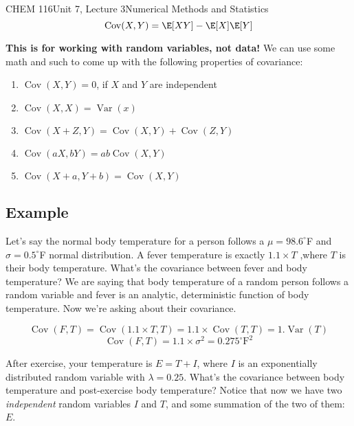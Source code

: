 \documentclass{article}
\DeclareMathOperator{\Var}{Var}
\DeclareMathOperator{\Cov}{Cov}
\begin{document}
\begin{tdoc}{CHEM 116}{Unit 7, Lecture 3}{Numerical Methods and Statistics}
\begin{equation}
  \Cov(X,Y) = \E[XY] - \E[X]\E[Y]
\end{equation}

{\bf This is for working with random variables, not data!} We can use
some math and such to come up with the following properties of covariance:

\begin{enumerate}

\item $\Cov(X,Y) = 0$, if $X$ and $Y$ are independent\\

\item $\Cov(X,X) = \Var(x)$\\

\item $\Cov(X + Z, Y) = \Cov(X,Y) + \Cov(Z, Y)$\\

\item $\Cov(aX, bY) = ab\Cov(X,Y)$\\

\item $\Cov(X + a, Y + b) = \Cov(X,Y)$\\

\end{enumerate}

\subsection{Example}

Let's say the normal body temperature for a person follows a $\mu = 98.6 ^{\circ}$F and $\sigma=0.5 ^{\circ}$F normal distribution. A fever temperature is exactly $1.1\times T$ ,where $T$ is their body temperature. What's the covariance between fever and body temperature? We are saying that body temperature of a random person follows a random variable and fever is an analytic, deterministic function of body temperature. Now we're asking about their covariance.

\[
\Cov(F, T) = \Cov(1.1\times T, T) = 1.1\times \Cov(T, T) = 1. \Var(T)
\]
\[
\Cov(F,T) = 1.1\times \sigma^2 = 0.275^\circ \textrm{F}^2
\]

After exercise, your temperature is $E = T + I$, where $I$ is an
exponentially distributed random variable with $\lambda =0.25$. What's the covariance between body temperature and post-exercise body temperature? Notice that now we have two \textit{independent} random variables $I$ and $T$, and some summation of the two of them: $E$.


\end{tdoc}
\end{document}

